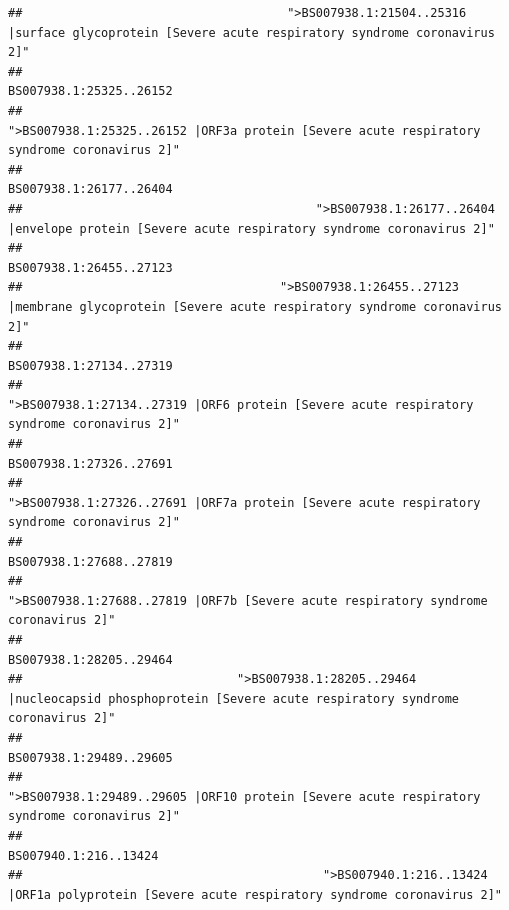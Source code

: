 \documentclass[
]{article}
\begin{document}
\begin{verbatim}
##                                     ">BS007938.1:21504..25316 |surface glycoprotein [Severe acute respiratory syndrome coronavirus 2]" 
##                                                                                                                BS007938.1:25325..26152 
##                                            ">BS007938.1:25325..26152 |ORF3a protein [Severe acute respiratory syndrome coronavirus 2]" 
##                                                                                                                BS007938.1:26177..26404 
##                                         ">BS007938.1:26177..26404 |envelope protein [Severe acute respiratory syndrome coronavirus 2]" 
##                                                                                                                BS007938.1:26455..27123 
##                                    ">BS007938.1:26455..27123 |membrane glycoprotein [Severe acute respiratory syndrome coronavirus 2]" 
##                                                                                                                BS007938.1:27134..27319 
##                                             ">BS007938.1:27134..27319 |ORF6 protein [Severe acute respiratory syndrome coronavirus 2]" 
##                                                                                                                BS007938.1:27326..27691 
##                                            ">BS007938.1:27326..27691 |ORF7a protein [Severe acute respiratory syndrome coronavirus 2]" 
##                                                                                                                BS007938.1:27688..27819 
##                                                    ">BS007938.1:27688..27819 |ORF7b [Severe acute respiratory syndrome coronavirus 2]" 
##                                                                                                                BS007938.1:28205..29464 
##                              ">BS007938.1:28205..29464 |nucleocapsid phosphoprotein [Severe acute respiratory syndrome coronavirus 2]" 
##                                                                                                                BS007938.1:29489..29605 
##                                            ">BS007938.1:29489..29605 |ORF10 protein [Severe acute respiratory syndrome coronavirus 2]" 
##                                                                                                                  BS007940.1:216..13424 
##                                          ">BS007940.1:216..13424 |ORF1a polyprotein [Severe acute respiratory syndrome coronavirus 2]" 

\end{verbatim}
\end{document}
